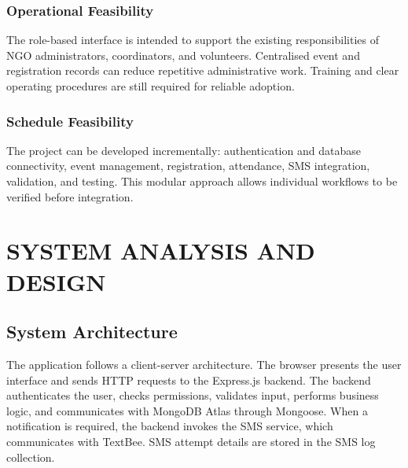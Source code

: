 \documentclass[12pt,a4paper,oneside]{report}
\begin{document}
\subsection{Operational Feasibility}
The role-based interface is intended to support the existing responsibilities of NGO administrators, coordinators, and volunteers. Centralised event and registration records can reduce repetitive administrative work. Training and clear operating procedures are still required for reliable adoption.

\subsection{Schedule Feasibility}
The project can be developed incrementally: authentication and database connectivity, event management, registration, attendance, SMS integration, validation, and testing. This modular approach allows individual workflows to be verified before integration.

\chapter{SYSTEM ANALYSIS AND DESIGN}

\section{System Architecture}
The application follows a client-server architecture. The browser presents the user interface and sends HTTP requests to the Express.js backend. The backend authenticates the user, checks permissions, validates input, performs business logic, and communicates with MongoDB Atlas through Mongoose. When a notification is required, the backend invokes the SMS service, which communicates with TextBee. SMS attempt details are stored in the SMS log collection.
\end{document}
